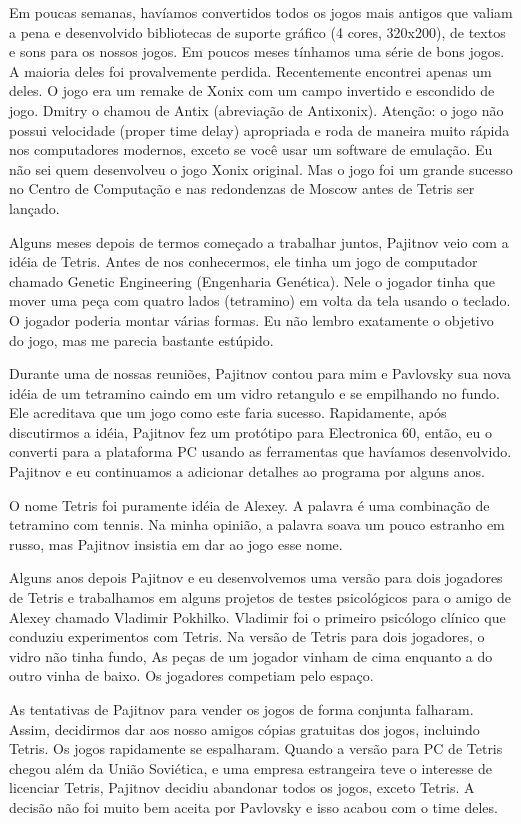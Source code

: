 \documentclass[
	12pt,				%
	openright,			%
	oneside,			%
	a4paper,			%
	brazil,				%
	]{abntex2}
\begin{document}
Em poucas semanas, havíamos convertidos todos os jogos mais antigos que valiam a pena e desenvolvido bibliotecas de suporte gráfico (4 cores, 320x200), de textos e sons para os nossos jogos. Em poucos meses tínhamos uma série de bons jogos. A maioria deles foi provalvemente perdida. Recentemente encontrei apenas um deles. O jogo era um remake de Xonix com um campo invertido e escondido de jogo. Dmitry o chamou de Antix (abreviação de Antixonix). Atenção: o jogo não possui velocidade (proper time delay) apropriada e roda de maneira muito rápida nos computadores modernos, exceto se você usar um software de emulação. Eu não sei quem desenvolveu o jogo Xonix original. Mas o jogo foi um grande sucesso no Centro de Computação e nas redondenzas de Moscow antes de Tetris ser lançado.

Alguns meses depois de termos começado a trabalhar juntos, Pajitnov veio com a idéia de Tetris. Antes de nos conhecermos, ele tinha um jogo de computador chamado Genetic Engineering (Engenharia Genética). Nele o jogador tinha que mover uma peça com quatro lados (tetramino) em volta da tela usando o teclado. O jogador poderia montar várias formas. Eu não lembro exatamente o objetivo do jogo, mas me parecia bastante estúpido.

Durante uma de nossas reuniões, Pajitnov contou para mim e Pavlovsky sua nova idéia de um tetramino caindo em um vidro retangulo e se empilhando no fundo. Ele acreditava que um jogo como este faria sucesso. Rapidamente, após discutirmos a idéia, Pajitnov fez um protótipo para Electronica 60, então, eu o converti para a plataforma PC usando as ferramentas que havíamos desenvolvido. Pajitnov e eu continuamos a adicionar detalhes ao programa por alguns anos.

O nome Tetris foi puramente idéia de Alexey. A palavra é uma combinação de tetramino com tennis. Na minha opinião, a palavra soava um pouco estranho em russo, mas Pajitnov insistia em dar ao jogo esse nome.

Alguns anos depois Pajitnov e eu desenvolvemos uma versão para dois jogadores de Tetris e trabalhamos em alguns projetos de testes psicológicos para o amigo de Alexey chamado Vladimir Pokhilko. Vladimir foi o primeiro psicólogo clínico que conduziu experimentos com Tetris. Na versão de Tetris para dois jogadores, o vidro não tinha fundo, As peças de um jogador vinham de cima enquanto a do outro vinha de baixo. Os jogadores competiam pelo espaço.

As tentativas de Pajitnov para vender os jogos de forma conjunta falharam. Assim, decidirmos dar aos nosso amigos cópias gratuitas dos jogos, incluindo Tetris. Os jogos rapidamente se espalharam. Quando a versão para PC de Tetris chegou além da União Soviética, e uma empresa estrangeira teve o interesse de licenciar Tetris, Pajitnov decidiu abandonar todos os jogos, exceto Tetris. A decisão não foi muito bem aceita por Pavlovsky e isso acabou com o time deles.
\end{document}
